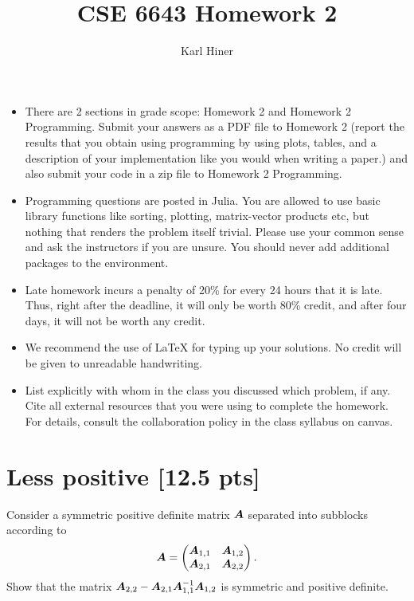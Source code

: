 \documentclass[twoside,10pt]{article}
\begin{document}
\title{CSE 6643 Homework 2}
\author{Karl Hiner}
\date{}
\maketitle

\begin{itemize}
  \item There are 2 sections in grade scope: Homework 2 and Homework 2 Programming. Submit your answers as a PDF file to Homework 2 (report the results that you obtain using programming by using plots, tables, and a description of your implementation like you would when writing a paper.) and also submit your code in a zip file to Homework 2 Programming. 
  \item Programming questions are posted in Julia. You are allowed to use basic library functions like sorting, plotting, matrix-vector products etc, but nothing that renders the problem itself trivial. Please use your common sense and ask the instructors if you are unsure. 
  You should never add additional packages to the environment.
  \item Late homework incurs a penalty of 20\% for every 24 hours that it is late. Thus, right after the deadline, it will only be worth 80\% credit, and after four days, it will not be worth any credit. 
  \item We recommend the use of LaTeX for typing up your solutions. No credit will be given to unreadable handwriting.
  \item List explicitly with whom in the class you discussed which problem, if any. Cite all external resources that you were using to complete the homework. For details, consult the collaboration policy in the class syllabus on canvas.
\end{itemize}

\section{Less positive [12.5 pts]} 
Consider a symmetric positive definite matrix $\bm{A}$ separated into subblocks according to
\begin{equation*}
  \bm{A} = \begin{pmatrix}
    \bm{A}_{1, 1} & \bm{A}_{1, 2} \\
    \bm{A}_{2, 1} & \bm{A}_{2, 2}
  \end{pmatrix}.
\end{equation*}
Show that the matrix $\bm{A}_{2,2} - \bm{A}_{2,1} \bm{A}_{1,1}^{-1} \bm{A}_{1,2}$ is symmetric and positive definite. 
\end{document}
